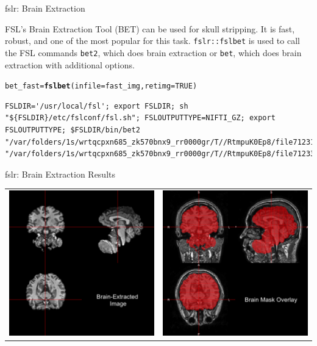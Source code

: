 \documentclass[11pt]{beamer}\usepackage[]{graphicx}\usepackage[]{color}
\makeatletter
\newcommand{\hlnum}[1]{\textcolor[rgb]{0.686,0.059,0.569}{#1}}%
\newcommand{\hlstd}[1]{\textcolor[rgb]{0.345,0.345,0.345}{#1}}%
\newcommand{\hlkwb}[1]{\textcolor[rgb]{0.69,0.353,0.396}{#1}}%
\newcommand{\hlkwc}[1]{\textcolor[rgb]{0.333,0.667,0.333}{#1}}%
\newcommand{\hlkwd}[1]{\textcolor[rgb]{0.737,0.353,0.396}{\textbf{#1}}}%
\newenvironment{kframe}{%
 \def\at@end@of@kframe{}%
 \ifinner\ifhmode%
  \def\at@end@of@kframe{\end{minipage}}%
  \begin{minipage}{\columnwidth}%
 \fi\fi%
 \def\FrameCommand##1{\hskip\@totalleftmargin \hskip-\fboxsep
 \colorbox{shadecolor}{##1}\hskip-\fboxsep
     \hskip-\linewidth \hskip-\@totalleftmargin \hskip\columnwidth}%
 \MakeFramed {\advance\hsize-\width
   \@totalleftmargin\z@ \linewidth\hsize
   \@setminipage}}%
 {\par\unskip\endMakeFramed%
 \at@end@of@kframe}
\newenvironment{knitrout}{}{} %
\makeatother
\begin{document}
\begin{frame}[fragile]{fslr: Brain Extraction}

FSL's Brain Extraction Tool (BET) can be used for skull stripping.  It is fast, robust, and one of the most popular for this task.  \verb|fslr::fslbet| is used to call the FSL commands \verb|bet2|, which does brain extraction or \verb|bet|, which does brain extraction with additional options.

\begin{knitrout}
\color{fgcolor}\begin{kframe}
\begin{alltt}
\hlstd{bet_fast} \hlkwb{=} \hlkwd{fslbet}\hlstd{(}\hlkwc{infile}\hlstd{=fast_img,} \hlkwc{retimg}\hlstd{=}\hlnum{TRUE}\hlstd{)}
\end{alltt}
\begin{verbatim}
FSLDIR='/usr/local/fsl'; export FSLDIR; sh "${FSLDIR}/etc/fslconf/fsl.sh"; FSLOUTPUTTYPE=NIFTI_GZ; export FSLOUTPUTTYPE; $FSLDIR/bin/bet2 "/var/folders/1s/wrtqcpxn685_zk570bnx9_rr0000gr/T//RtmpuK0Ep8/file712310f4319d.nii.gz" "/var/folders/1s/wrtqcpxn685_zk570bnx9_rr0000gr/T//RtmpuK0Ep8/file7123398dde28"  
\end{verbatim}
\end{kframe}
\end{knitrout}
\end{frame}




\begin{frame}[fragile]{fslr: Brain Extraction Results}

\begin{tabular}{cc}
\includegraphics[width=0.5\linewidth]{BET_Image.png} & \includegraphics[width=0.5\linewidth]{BET_Image_Overlay.png}
\end{tabular}

\end{frame}
\end{document}
